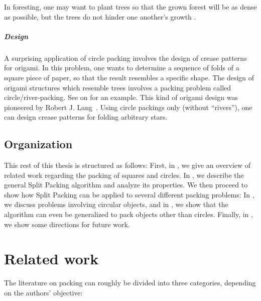 \documentclass[a4paper,style=print,bibliography=totoc,nexus,lnum,extramargin]{tubsbook}
\begin{document}
In foresting, one may want to plant trees so that the grown forest will be as dense as possible, but the trees do not hinder one another's growth \cite{SMCSCG2007new}.

\paragraph{Design}

A surprising application of circle packing involves the design of crease patterns for origami. In this problem, one wants to determine a sequence of folds of a square piece of paper, so that the result resembles a specific shape. The design of origami structures which resemble trees involves a packing problem called circle/river-packing. See  on  for an example. This kind of origami design was pioneered by Robert J. Lang~\cite{lang1996computational}. Using circle packings only (without “rivers”), one can design crease patterns for folding arbitrary stars.

\pagebreak

\section{Organization}

This rest of this thesis is structured as follows:
First, in \textbf{}, we give an overview of related work regarding the packing of squares and circles.
In \textbf{}, we describe the general Split Packing algorithm and analyze its properties.
We then proceed to show how Split Packing can be applied to several different packing problems: In \textbf{}, we discuss problems involving circular objects, and in \textbf{}, we show that the algorithm can even be generalized to pack objects other than circles.
Finally, in \textbf{}, we show some directions for future work.

\chapter{Related work}\label{ch:related-work}

The literature on packing can roughly be divided into three categories, depending on the authors' objective:
\end{document}
